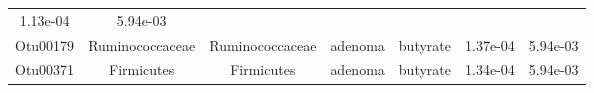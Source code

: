 \documentclass[11pt,]{article}
\begin{document}
\begin{longtable}[]{@{}ccccccc@{}}
\begin{minipage}[t]{0.09\columnwidth}
1.13e-04\strut
\end{minipage} & \begin{minipage}[t]{0.09\columnwidth}\centering\strut
5.94e-03\strut
\end{minipage}\tabularnewline
\begin{minipage}[t]{0.09\columnwidth}\centering\strut
Otu00179\strut
\end{minipage} & \begin{minipage}[t]{0.17\columnwidth}\centering\strut
Ruminococcaceae\strut
\end{minipage} & \begin{minipage}[t]{0.17\columnwidth}\centering\strut
Ruminococcaceae\strut
\end{minipage} & \begin{minipage}[t]{0.09\columnwidth}\centering\strut
adenoma\strut
\end{minipage} & \begin{minipage}[t]{0.11\columnwidth}\centering\strut
butyrate\strut
\end{minipage} & \begin{minipage}[t]{0.09\columnwidth}\centering\strut
1.37e-04\strut
\end{minipage} & \begin{minipage}[t]{0.09\columnwidth}\centering\strut
5.94e-03\strut
\end{minipage}\tabularnewline
\begin{minipage}[t]{0.09\columnwidth}\centering\strut
Otu00371\strut
\end{minipage} & \begin{minipage}[t]{0.17\columnwidth}\centering\strut
Firmicutes\strut
\end{minipage} & \begin{minipage}[t]{0.17\columnwidth}\centering\strut
Firmicutes\strut
\end{minipage} & \begin{minipage}[t]{0.09\columnwidth}\centering\strut
adenoma\strut
\end{minipage} & \begin{minipage}[t]{0.11\columnwidth}\centering\strut
butyrate\strut
\end{minipage} & \begin{minipage}[t]{0.09\columnwidth}\centering\strut
1.34e-04\strut
\end{minipage} & \begin{minipage}[t]{0.09\columnwidth}\centering\strut
5.94e-03\strut
\end{minipage}\tabularnewline

\end{longtable}
\end{document}
